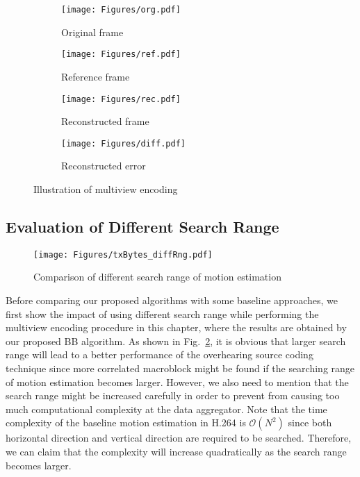 \begin{figure}
\begin{center}
\begin{subfigure}[b]{0.45\columnwidth}
\texttt{[image: Figures/org.pdf]}
\caption{Original frame}
\end{subfigure}
%
\begin{subfigure}[b]{0.45\columnwidth}
\texttt{[image: Figures/ref.pdf]}
\caption{Reference frame}
\end{subfigure}
%
\begin{subfigure}[b]{0.45\columnwidth}
\texttt{[image: Figures/rec.pdf]}
\caption{Reconstructed frame}
\end{subfigure}
%
\begin{subfigure}[b]{0.45\columnwidth}
\texttt{[image: Figures/diff.pdf]}
\caption{Reconstructed error}
\end{subfigure}
%
\caption{\label{fig::multiViewImageDemo} Illustration of multiview encoding}
\end{center}
\end{figure}
%

\subsection{Evaluation of Different Search Range}
%
\begin{figure}
\begin{center}
\texttt{[image: Figures/txBytes\_diffRng.pdf]}
\caption{\label{fig::txBytes_diffRng} Comparison of different search range of motion estimation}
\end{center}
\end{figure}
Before comparing our proposed algorithms with some baseline approaches, we first show the impact of using different search range while performing the multiview encoding procedure in this chapter, where the results are obtained by our proposed BB algorithm.
As shown in Fig.~\ref{fig::txBytes_diffRng}, it is obvious that larger search range will lead to a better performance of the overhearing source coding technique since more correlated macroblock might be found if the searching range of motion estimation becomes larger.
However, we also need to mention that the search range might be increased carefully in order to prevent from causing too much computational complexity at the data aggregator.
Note that the time complexity of the baseline motion estimation in H.264 is $\mathcal{O}(N^2)$ since both horizontal direction and vertical direction are required to be searched.
Therefore, we can claim that the complexity will increase quadratically as the search range becomes larger.

